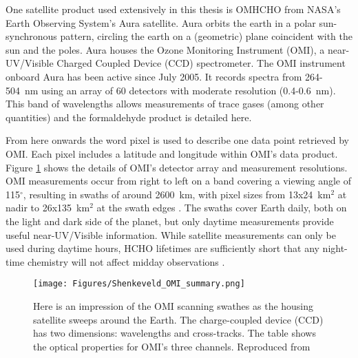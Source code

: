   One satellite product used extensively in this thesis is OMHCHO from NASA's Earth Observing System's Aura satellite. %
  Aura orbits the earth in a polar sun-synchronous pattern, circling the earth on a (geometric) plane coincident with the sun and the poles.
  Aura houses the Ozone Monitoring Instrument (OMI), a near-UV/Visible Charged Coupled Device (CCD) spectrometer.
  The OMI instrument onboard Aura has been active since July 2005.
  It records spectra from 264-504~nm using an array of 60 detectors with moderate resolution (0.4-0.6~nm).
  This band of wavelengths allows measurements of trace gases (among other quantities) and the formaldehyde product is detailed here.
  
  
  From here onwards the word pixel is used to describe one data point retrieved by OMI.
  Each pixel includes a latitude and longitude within OMI's data product.
  Figure \ref{LR:HCHO:Sat:fig_Shenkeveld_OMI_summary} shows the details of OMI's detector array and measurement resolutions.
  OMI measurements occur from right to left on a band covering a viewing angle of 115$^{\circ}$, resulting in swaths of around 2600~km, with pixel sizes from 13x24~km$^2$ at nadir to 26x135~km$^2$ at the swath edges \parencite{Abad2015}.
  The swaths cover Earth daily, both on the light and dark side of the planet, but only daytime measurements provide useful near-UV/Visible information.
  While satellite measurements can only be used during daytime hours, HCHO lifetimes are sufficiently short that any night-time chemistry will not affect midday observations \parencite{Wolfe2016}.
  
  \begin{figure}
    \texttt{[image: Figures/Shenkeveld\_OMI\_summary.png]}
    \caption{ %
      Here is an impression of the OMI scanning swathes as the housing satellite sweeps around the Earth.
      The charge-coupled device (CCD) has two dimensions: wavelengths and cross-tracks.
      The table shows the optical properties for OMI's three channels.
      Reproduced from \textcite{Schenkeveld2017}
    }\label{LR:HCHO:Sat:fig_Shenkeveld_OMI_summary}
  \end{figure}
  
